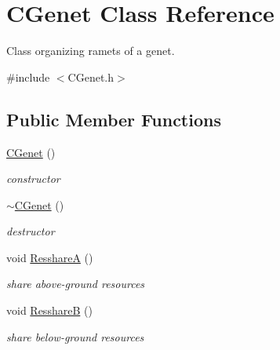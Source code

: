 \hypertarget{class_c_genet}{}\section{C\+Genet Class Reference}
\label{class_c_genet}


Class organizing ramets of a genet.  




{\ttfamily \#include $<$C\+Genet.\+h$>$}

\subsection*{Public Member Functions}
\begin{DoxyCompactItemize}
\item 
\mbox{\label{class_c_genet_a9981762197271e0c997303497b2cf1a1}} 
\mbox{\hyperlink{class_c_genet_a9981762197271e0c997303497b2cf1a1}{C\+Genet}} ()
\begin{DoxyCompactList}\small\item\em constructor \end{DoxyCompactList}\item 
\mbox{\label{class_c_genet_adfef4562d1de06546fc1c2b18a006e1d}} 
\mbox{\hyperlink{class_c_genet_adfef4562d1de06546fc1c2b18a006e1d}{$\sim$\+C\+Genet}} ()
\begin{DoxyCompactList}\small\item\em destructor \end{DoxyCompactList}\item 
void \mbox{\hyperlink{class_c_genet_a4cc99b416ede10fdb87dff1c8c820f37}{ResshareA}} ()
\begin{DoxyCompactList}\small\item\em share above-\/ground resources \end{DoxyCompactList}\item 
void \mbox{\hyperlink{class_c_genet_a2bc46111b9623273b6cfbf1944d063c1}{ResshareB}} ()
\begin{DoxyCompactList}\small\item\em share below-\/ground resources \end{DoxyCompactList}\end{DoxyCompactItemize}

